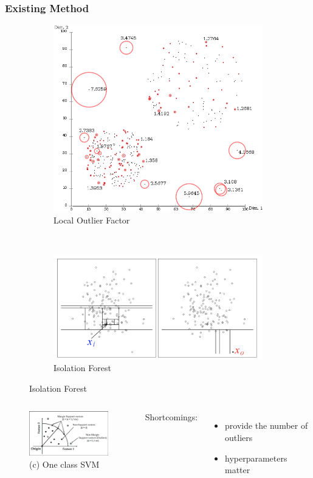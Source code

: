 \documentclass[notheorems]{beamer}
\begin{document}
\begin{frame}
\frametitle{Existing Method}
\begin{figure}
	\centering
	\begin{subfigure}{0.33\textwidth}
		\includegraphics[width=\textwidth]{pic/lof.png}
		\caption{Local Outlier Factor}
	\end{subfigure}~
	\begin{subfigure}{0.58\textwidth}
		\includegraphics[width=\textwidth]{pic/if.png}
		\caption{Isolation Forest}
	\end{subfigure}
\end{figure}  
	\begin{columns}
\begin{figure}
		\includegraphics[width=4.5cm]{pic/one_class_svm.png}
		\caption*{ \textcolor{thupurple}{(c)} One class SVM}
\end{figure}
\quad Shortcomings:
\begin{itemize}
\item provide the number of outliers
\item hyperparameters matter
\end{itemize}
\end{columns}
\end{frame}
\end{document}
